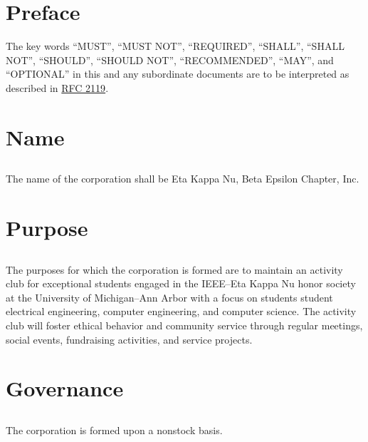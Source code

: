 \documentclass[incorporation,proposal,withoutpreface,withoutoptional,11pt,final]{bylaws}
\begin{document}
\frontmatter
\maketitle
\setcounter{tocdepth}{0}
\mainmatter
\chapter*{Preface}
The key words ``MUST'', ``MUST NOT'', ``REQUIRED'', ``SHALL'', ``SHALL NOT'', ``SHOULD'', ``SHOULD NOT'', ``RECOMMENDED'',  ``MAY'', and ``OPTIONAL'' in this and any subordinate documents are to be interpreted as described in \href{http://www.ietf.org/rfc/rfc2119.txt}{RFC 2119}.
%
%
%
%
%
%

%

\chapter{Name}
\section{} The name of the corporation shall be Eta Kappa Nu, Beta Epsilon Chapter, Inc.

\chapter{Purpose}
\section{} The purposes for which the corporation is formed are to maintain an activity club for exceptional students engaged in the IEEE--Eta Kappa Nu honor society at the University of Michigan--Ann Arbor with a focus on students student electrical engineering, computer engineering, and computer science.
The activity club will foster ethical behavior and community service through regular meetings, social events, fundraising activities, and service projects.

\chapter{Governance}
\section{} The corporation is formed upon a nonstock basis.
\end{document}
